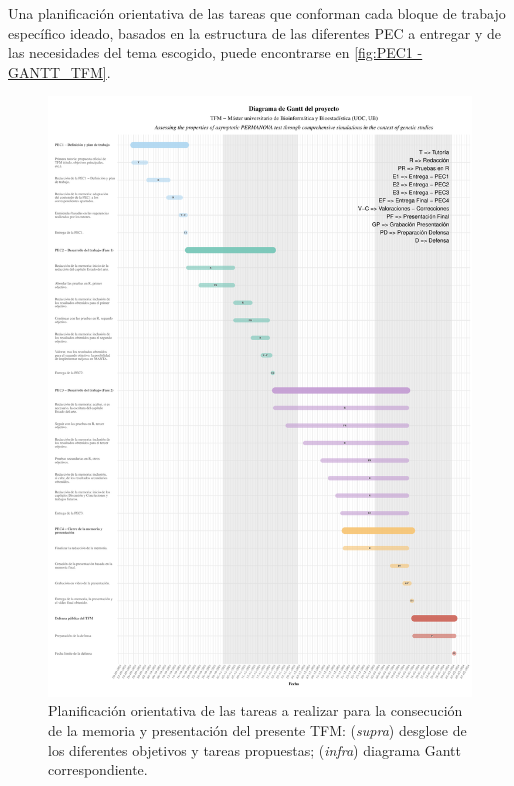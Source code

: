 \documentclass[IB,BIB]{TFUOC}%
\begin{document}
Una planificación orientativa de las tareas que conforman cada bloque de trabajo específico ideado, basados en la estructura de las diferentes PEC a entregar y de las necesidades del tema escogido, puede encontrarse en \ref{fig:PEC1 - GANTT_TFM}. 


\begin{figure}[!htbp]
    \centering
    \includegraphics[scale=.45]{TFMGantt.pdf}
    \caption{\scriptsize{Planificación orientativa de las tareas a realizar para la consecución de la memoria y presentación del presente TFM: (\textit{supra}) desglose de los diferentes objetivos y tareas propuestas; (\textit{infra}) diagrama Gantt correspondiente.}}
    \label{fig:GANTT_TFM}
\end{figure}
\end{document}
